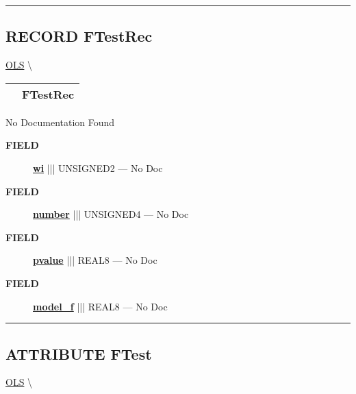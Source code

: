 \rule{\linewidth}{0.5pt}
\subsection*{\textsf{\colorbox{headtoc}{\color{white} RECORD}
FTestRec}}

\hypertarget{ecldoc:linearregression.ols.ftestrec}{}
\hspace{0pt} \hyperlink{ecldoc:linearregression.ols}{OLS} \textbackslash 

{\renewcommand{\arraystretch}{1.5}
\begin{tabularx}{\textwidth}{|>{\raggedright\arraybackslash}l|X|}
\hline
\hspace{0pt}\mytexttt{\color{red} } & \textbf{FTestRec} \\
\hline
\end{tabularx}
}

\par





No Documentation Found







\par
\begin{description}
\item [\colorbox{tagtype}{\color{white} \textbf{\textsf{FIELD}}}] \textbf{\underline{wi}} ||| UNSIGNED2 --- No Doc
\item [\colorbox{tagtype}{\color{white} \textbf{\textsf{FIELD}}}] \textbf{\underline{number}} ||| UNSIGNED4 --- No Doc
\item [\colorbox{tagtype}{\color{white} \textbf{\textsf{FIELD}}}] \textbf{\underline{pvalue}} ||| REAL8 --- No Doc
\item [\colorbox{tagtype}{\color{white} \textbf{\textsf{FIELD}}}] \textbf{\underline{model\_f}} ||| REAL8 --- No Doc
\end{description}





\rule{\linewidth}{0.5pt}
\subsection*{\textsf{\colorbox{headtoc}{\color{white} ATTRIBUTE}
FTest}}

\hypertarget{ecldoc:linearregression.ols.ftest}{}
\hspace{0pt} \hyperlink{ecldoc:linearregression.ols}{OLS} \textbackslash 

